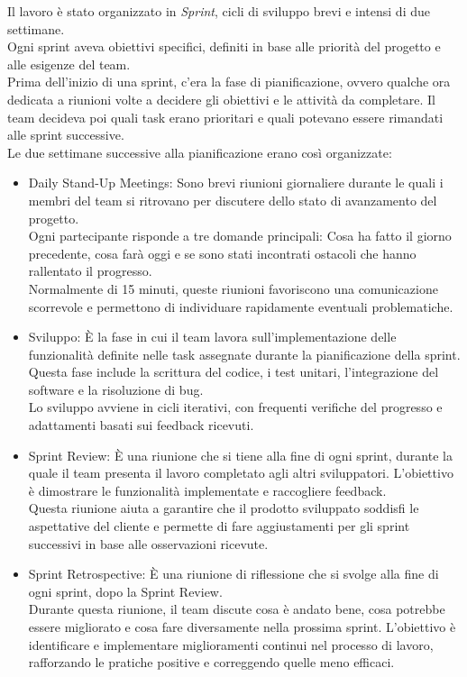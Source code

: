 Il lavoro è stato organizzato in \textit{Sprint}, cicli di sviluppo brevi e intensi
di due settimane.\\ Ogni sprint aveva obiettivi specifici, definiti in base alle
priorità del progetto e alle esigenze del team.\\ Prima dell'inizio di una
sprint, c'era la fase di pianificazione, ovvero qualche ora dedicata a riunioni
volte a decidere gli obiettivi e le attività da completare. Il team decideva poi
quali task erano prioritari e quali potevano essere rimandati alle sprint successive.\\
Le due settimane successive alla pianificazione erano così organizzate:
\begin{itemize}
  \item Daily Stand-Up Meetings: Sono brevi riunioni giornaliere durante le
    quali i membri del team si ritrovano per discutere dello stato di
    avanzamento del progetto.\\ Ogni partecipante risponde a tre domande
    principali: Cosa ha fatto il giorno precedente, cosa farà oggi e se sono
    stati incontrati ostacoli che hanno rallentato il progresso.\\ Normalmente
    di 15 minuti, queste riunioni favoriscono una comunicazione scorrevole e permettono
    di individuare rapidamente eventuali problematiche.

  \item Sviluppo: È la fase in cui il team lavora sull'implementazione delle
    funzionalità definite nelle task assegnate durante la pianificazione della
    sprint.\\ Questa fase include la scrittura del codice, i test unitari, l'integrazione
    del software e la risoluzione di bug.\\ Lo sviluppo avviene in cicli
    iterativi, con frequenti verifiche del progresso e adattamenti basati sui feedback
    ricevuti.

  \item Sprint Review: È una riunione che si tiene alla fine di ogni sprint, durante
    la quale il team presenta il lavoro completato agli altri sviluppatori. L'obiettivo
    è dimostrare le funzionalità implementate e raccogliere feedback.\\ Questa
    riunione aiuta a garantire che il prodotto sviluppato soddisfi le
    aspettative del cliente e permette di fare aggiustamenti per gli sprint
    successivi in base alle osservazioni ricevute.

  \item Sprint Retrospective: È una riunione di riflessione che si svolge alla
    fine di ogni sprint, dopo la Sprint Review.\\ Durante questa riunione, il
    team discute cosa è andato bene, cosa potrebbe essere migliorato e cosa fare
    diversamente nella prossima sprint. L'obiettivo è identificare e
    implementare miglioramenti continui nel processo di lavoro, rafforzando le pratiche
    positive e correggendo quelle meno efficaci.
\end{itemize}

